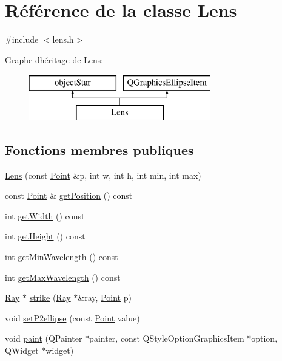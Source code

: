 \hypertarget{class_lens}{}\section{Référence de la classe Lens}
\label{class_lens}


{\ttfamily \#include $<$lens.\+h$>$}

Graphe d\textquotesingle{}héritage de Lens\+:\begin{figure}[H]
\begin{center}
\leavevmode
\includegraphics[height=2.000000cm]{class_lens}
\end{center}
\end{figure}
\subsection*{Fonctions membres publiques}
\begin{DoxyCompactItemize}
\item 
\mbox{\hyperlink{class_lens_a5e7d0da4faeccb319f43969427c89bf6}{Lens}} (const \mbox{\hyperlink{class_point}{Point}} \&p, int w, int h, int min, int max)
\item 
const \mbox{\hyperlink{class_point}{Point}} \& \mbox{\hyperlink{class_lens_a242443a28d03572e5fa1b9d7a066ade2}{get\+Position}} () const
\item 
int \mbox{\hyperlink{class_lens_ac4e4c19fc323c3735b336428d3bc7de0}{get\+Width}} () const
\item 
int \mbox{\hyperlink{class_lens_add1b885535031d16db3252748095a3ba}{get\+Height}} () const
\item 
int \mbox{\hyperlink{class_lens_a3aacfbf2cc2dcd7bef2927305c6038ff}{get\+Min\+Wavelength}} () const
\item 
int \mbox{\hyperlink{class_lens_ae4b3e16a607ae895c09b94a8beb7fdf3}{get\+Max\+Wavelength}} () const
\item 
\mbox{\hyperlink{class_ray}{Ray}} $\ast$ \mbox{\hyperlink{class_lens_a356e82ca429773ef99f3eb2a85b046bf}{strike}} (\mbox{\hyperlink{class_ray}{Ray}} $\ast$\&ray, \mbox{\hyperlink{class_point}{Point}} p)
\item 
void \mbox{\hyperlink{class_lens_a4b0d35544997517854358dbc05e0d672}{set\+P2ellipse}} (const \mbox{\hyperlink{class_point}{Point}} value)
\item 
void \mbox{\hyperlink{class_lens_a8662802e4e08ba7e889353eabdb002cc}{paint}} (Q\+Painter $\ast$painter, const Q\+Style\+Option\+Graphics\+Item $\ast$option, Q\+Widget $\ast$widget)
\end{DoxyCompactItemize}
